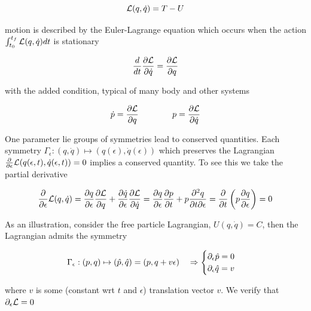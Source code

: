 \documentclass[12pt]{article}
\begin{document}
\begin{equation}\label{eq:lagrangian}
    \mathcal L(q,\dot q) = T - U
\end{equation}

motion is described by the Euler-Lagrange equation which occurs when the action $\int_{t_0}^{t_f} \mathcal L(q,\dot q) dt$ is stationary

\begin{equation}\label{eq:euler lagrange}
    \frac{d}{dt}\frac{\partial \mathcal L}{\partial \dot q} = \frac{\partial \mathcal L}{\partial q}
\end{equation}

with the added condition, typical of many body and other systems

\begin{equation}\label{eq:lagrangian added conditions}
    \dot p = \frac{\partial \mathcal L}{\partial q} \qquad\qquad p = \frac{\partial \mathcal L}{\partial \dot q}
\end{equation}

One parameter lie groups of symmetries lead to conserved quantities. Each symmetry $\Gamma_\epsilon : (q,\dot q)\mapsto (q(\epsilon),\dot q(\epsilon))$ which preserves the Lagrangian $\frac{\partial}{\partial\epsilon}\mathcal L(q(\epsilon,t),\dot q(\epsilon,t)) = 0$ implies a conserved quantity. To see this we take the partial derivative

\begin{equation}\label{eq:noether's theorem 1 derivation}
\frac{\partial }{\partial \epsilon} \mathcal L(q,\dot q) = \frac{\partial q}{\partial \epsilon} \frac{\partial \mathcal L}{\partial q} + \frac{\partial \dot q}{\partial \epsilon}\frac{\partial \mathcal L}{\partial \dot q} = \frac{\partial q}{\partial \epsilon}\frac{\partial p}{\partial t} + p \frac{\partial^2 q}{\partial t \partial \epsilon} = \frac{\partial }{\partial t}\left( p \frac{\partial q}{\partial \epsilon} \right) = 0
\end{equation}

 As an illustration, consider the free particle Lagrangian, $U(q,\dot q) = C$, then the Lagrangian admits the symmetry

$$\Gamma_\epsilon : (p,q)\mapsto (\hat p,\hat q) = (p,q + v\epsilon) \quad \Rightarrow \begin{cases} \partial_\epsilon \hat p = 0\\ \partial_\epsilon \hat q = v \end{cases}$$

where $v$ is some (constant wrt $t$ and $\epsilon$) translation vector $v$. We verify that $\partial_\epsilon \mathcal L = 0$
\end{document}
